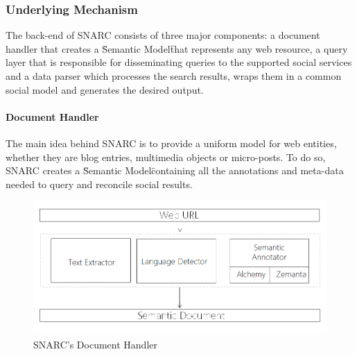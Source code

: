 \documentclass[onecolumn, crcready]{iosart2c}
\begin{document}
\subsubsection{Underlying Mechanism}
The back-end of SNARC consists of three major components: a document handler that creates a \"Semantic Model\" that represents any web resource, a query layer that is responsible for disseminating queries to the supported social services and a data parser which processes the search results, wraps them in a common social model and generates the desired output.

\paragraph{Document Handler}
The main idea behind SNARC is to provide a uniform model for web entities, whether they are blog entries, multimedia objects or micro-posts. To do so, SNARC creates a \"Semantic Model\" containing all the annotations and meta-data needed to query and reconcile social results. 
\begin{figure}[ht!]
  \centering
    \includegraphics[scale=0.5]{architecture-part1.png} 
  \caption{SNARC's Document Handler}
\end{figure}
\end{document}
